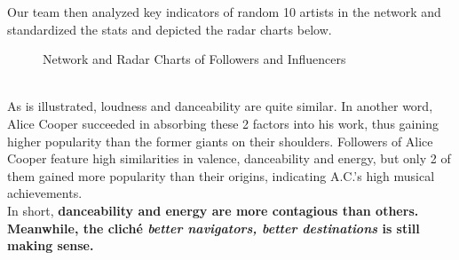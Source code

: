 \documentclass[12pt]{article}
\begin{document}
{{Our team then analyzed key indicators of random 10 artists in the network and standardized the stats and depicted the radar charts below.
\begin{figure}[h]
\centering
	\begin{subfigure}[]
		{\texttt{[image: Music15]}}
	\end{subfigure}
	\hspace{0.5cm}
	\begin{subfigure}[]
		{\texttt{[image: Music16]}}	
	\end{subfigure}
\caption{Network and Radar Charts of Followers and Influencers}
\end{figure}\\
As is illustrated, loudness and danceability are quite similar. In another word, Alice Cooper succeeded in absorbing these 2 factors into his work, thus gaining higher popularity than the former giants on their shoulders. Followers of Alice Cooper feature high similarities in valence, danceability and energy, but only 2 of them gained more popularity than their origins, indicating A.C.'s high musical achievements.\\[2ex]
In short, \bfseries{danceability and energy are more contagious than others. Meanwhile, the cliché \textit{better navigators, better destinations} is still making sense.}}
}
\end{document}
